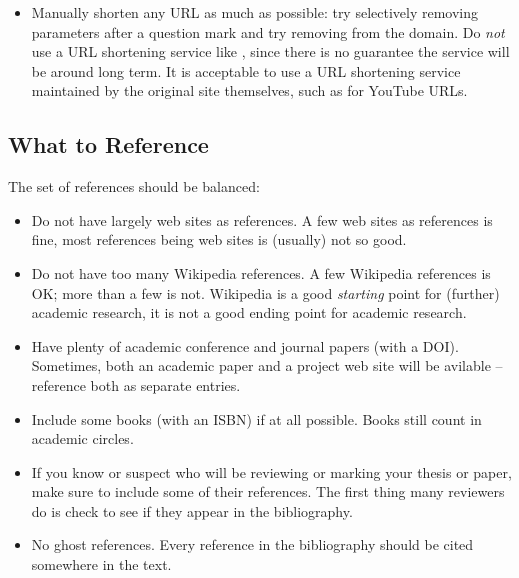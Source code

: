 \begin{itemize}
      \item Manually shorten any URL as much as possible: try selectively
            removing parameters after a question mark and try removing
             from the domain. Do \emph{not} use a URL shortening
            service like , since there is no guarantee the
            service will be around long term. It is acceptable to use a URL
            shortening service maintained by the original site themselves, such
            as  for YouTube URLs.

\end{itemize}







\subsection{What to Reference}

The set of references should be balanced:
\begin{itemize}
      \item Do not have largely web sites as references. A few web sites as
            references is fine, most references being web sites is (usually) not
            so good.

      \item Do not have too many Wikipedia references. A few Wikipedia
            references is OK; more than a few is not. Wikipedia is a good
            \emph{starting} point for (further) academic research, it is not a
            good ending point for academic research.

      \item Have plenty of academic conference and journal papers (with a
            DOI). Sometimes, both an academic paper and a project web site will
            be avilable -- reference both as separate entries.

      \item Include some books (with an ISBN) if at all possible. Books
            still count in academic circles.

      \item If you know or suspect who will be reviewing or marking your
            thesis or paper, make sure to include some of their references. The
            first thing many reviewers do is check to see if they appear in the
            bibliography.

      \item No ghost references. Every reference in the bibliography should
            be cited somewhere in the text.

\end{itemize}






